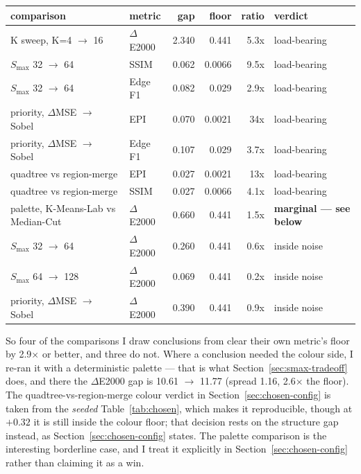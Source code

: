 \documentclass[11pt,a4paper]{article}
\begin{document}
\begin{table}[htbp]
\centering
\footnotesize
\begin{tabular}{@{}l l r r r l@{}}
\toprule
\textbf{comparison} & \textbf{metric} & \textbf{gap} & \textbf{floor} & \textbf{ratio} & \textbf{verdict}\\
\midrule
K sweep, K=4 $\rightarrow$ 16                       & $\Delta$E2000 & 2.340 & 0.441 & 5.3x & load-bearing \\
$S_{\max}$ 32 $\rightarrow$ 64                     & SSIM         & 0.062 & 0.0066 & 9.5x & load-bearing \\
$S_{\max}$ 32 $\rightarrow$ 64                     & Edge F1      & 0.082 & 0.029 & 2.9x & load-bearing \\
priority, $\Delta$MSE $\rightarrow$ Sobel          & EPI          & 0.070 & 0.0021 & 34x & load-bearing \\
priority, $\Delta$MSE $\rightarrow$ Sobel          & Edge F1      & 0.107 & 0.029 & 3.7x & load-bearing \\
quadtree vs region-merge                          & EPI          & 0.027 & 0.0021 & 13x & load-bearing \\
quadtree vs region-merge                          & SSIM         & 0.027 & 0.0066 & 4.1x & load-bearing \\
palette, K-Means-Lab vs Median-Cut                & $\Delta$E2000 & 0.660 & 0.441 & 1.5x & \textbf{marginal --- see below} \\
$S_{\max}$ 32 $\rightarrow$ 64                     & $\Delta$E2000 & 0.260 & 0.441 & 0.6x & inside noise \\
$S_{\max}$ 64 $\rightarrow$ 128                    & $\Delta$E2000 & 0.069 & 0.441 & 0.2x & inside noise \\
priority, $\Delta$MSE $\rightarrow$ Sobel          & $\Delta$E2000 & 0.390 & 0.441 & 0.9x & inside noise \\
\bottomrule
\end{tabular}
\end{table}

So four of the comparisons I draw conclusions from clear their own metric's
floor by 2.9$\times$ or better, and three do not. Where a conclusion needed the
colour side, I re-ran it with a deterministic palette --- that is what
Section~\ref{sec:smax-tradeoff} does, and there the $\Delta$E2000 gap is
10.61 $\rightarrow$ 11.77 (spread 1.16, 2.6$\times$ the floor). The
quadtree-vs-region-merge colour verdict in Section~\ref{sec:chosen-config} is
taken from the \emph{seeded} Table~\ref{tab:chosen}, which makes it
reproducible, though at $+0.32$ it is still inside the colour floor; that
decision rests on the structure gap instead, as Section~\ref{sec:chosen-config}
states. The palette comparison is the interesting borderline case, and I treat it
explicitly in Section~\ref{sec:chosen-config} rather than claiming it as a win.
\end{document}
